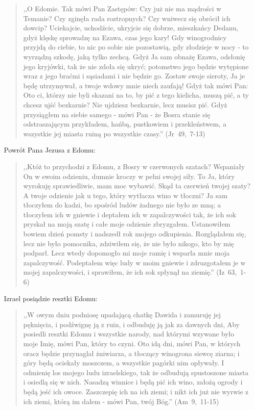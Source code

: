 \documentclass[10pt,a4paper,oneside]{article}
\begin{document}
\begin{quote}
,,O Edomie. Tak mówi Pan Zastępów: Czy już nie ma mądrości w Temanie? Czy zginęła rada roztropnych? Czy wniwecz się obrócił ich dowcip? Uciekajcie, uchodźcie, ukryjcie się dobrze, mieszkańcy Dedanu, gdyż klęskę sprowadzę na Ezawa, czas jego kary! Gdy winogrodnicy przyjdą do ciebie, to nic po sobie nie pozostawią, gdy złodzieje w nocy - to wyrządzą szkodę, jaką tylko zechcą. Gdyż Ja sam obnażę Ezawa, odsłonię jego kryjówki, tak że nie zdoła się ukryć; potomstwo jego będzie wytępione wraz z jego braćmi i sąsiadami i nie będzie go. Zostaw swoje sieroty, Ja je będę utrzymywał, a twoje wdowy mnie niech zaufają! Gdyż tak mówi Pan: Oto ci, którzy nie byli skazani na to, by pić z tego kielicha, muszą pić, a ty chcesz ujść bezkarnie? Nie ujdziesz bezkarnie, lecz musisz pić. Gdyż przysiągłem na siebie samego - mówi Pan - że Bosra stanie się odstraszającym przykładem, hańbą, pustkowiem i przekleństwem, a wszystkie jej miasta ruiną po wszystkie czasy.'' (Jr~49,~7-13)
\end{quote}
Powrót Pana Jezusa z Edomu:
\begin{quote}
,,Któż to przychodzi z Edomu, z Bosry w czerwonych szatach? Wspaniały On w swoim odzieniu, dumnie kroczy w pełni swojej siły. To Ja, który wyrokuję sprawiedliwie, mam moc wybawić. Skąd ta czerwień twojej szaty? A twoje odzienie jak u tego, który wytłacza wino w tłoczni? Ja sam tłoczyłem do kadzi, bo spośród ludów żadnego nie było ze mną; a tłoczyłem ich w gniewie i deptałem ich w zapalczywości tak, że ich sok pryskał na moją szatę i całe moje odzienie zbryzgałem. Ustanowiłem bowiem dzień pomsty i nadszedł rok mojego odkupienia. Rozglądałem się, lecz nie było pomocnika, zdziwiłem się, że nie było nikogo, kto by mię podparł. Lecz wtedy dopomogło mi moje ramię i wsparła mnie moja zapalczywość. Podeptałem więc ludy w moim gniewie i zdruzgotałem je w mojej zapalczywości, i sprawiłem, że ich sok spłynął na ziemię.'' (Iz~63,~1-6)
\end{quote}
Izrael posiądzie resztki Edomu:
\begin{quote}
,,W owym dniu podniosę upadającą chatkę Dawida i zamuruję jej pęknięcia, i podźwignę ją z ruin, i odbuduję ją jak za dawnych dni, Aby posiedli resztki Edomu i wszystkie narody, nad którymi wzywane było moje Imię, mówi Pan, który to czyni. Oto idą dni, mówi Pan, w których oracz będzie przynaglał żniwiarza, a tłoczący winogrona siewcę ziarna; i góry będą ociekały moszczem, a wszystkie pagórki nim opływały. I odmienię los mojego ludu izraelskiego, tak że odbudują spustoszone miasta i osiedlą się w nich. Nasadzą winnice i będą pić ich wino, założą ogrody i będą jeść ich owoce. Zaszczepię ich na ich ziemi; i nikt ich już nie wyrwie z ich ziemi, którą im dałem - mówi Pan, twój Bóg.'' (Am~9,~11-15)
\end{quote}
\end{document}
